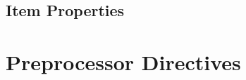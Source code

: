 \documentclass[a4paper]{report}
\begin{document}
\section{Item Properties}
\label{types-itemprops}

\chapter{Preprocessor Directives}
\label{directives}
\end{document}
